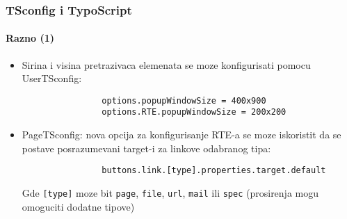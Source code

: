 \begin{frame}[fragile]
	\frametitle{TSconfig i TypoScript}
	\framesubtitle{Razno (1)}

	\begin{itemize}
		\item Sirina i visina pretrazivaca elemenata se moze konfigurisati pomocu UserTSconfig:

			\begin{lstlisting}
				options.popupWindowSize = 400x900
				options.RTE.popupWindowSize = 200x200
			\end{lstlisting}


		\item PageTSconfig: nova opcija za konfigurisanje RTE-a se moze iskoristit da se postave posrazumevani target-i za linkove odabranog tipa:

			\begin{lstlisting}
				buttons.link.[type].properties.target.default
			\end{lstlisting}

			Gde \texttt{[type]} moze bit \texttt{page}, \texttt{file}, \texttt{url}, \texttt{mail} ili \texttt{spec}\newline
			(prosirenja mogu omoguciti dodatne tipove)

	\end{itemize}

\end{frame}


